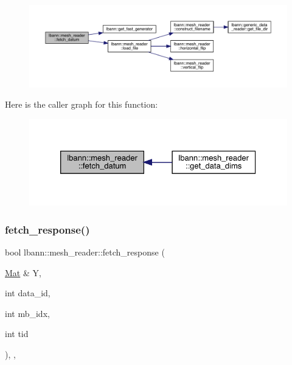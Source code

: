 \begin{figure}[H]
\begin{center}
\leavevmode
\includegraphics[width=350pt]{classlbann_1_1mesh__reader_a0ed2aa6d5ec6509c15d0cf7d9657df29_cgraph}
\end{center}
\end{figure}
Here is the caller graph for this function\+:\nopagebreak
\begin{figure}[H]
\begin{center}
\leavevmode
\includegraphics[width=326pt]{classlbann_1_1mesh__reader_a0ed2aa6d5ec6509c15d0cf7d9657df29_icgraph}
\end{center}
\end{figure}
\mbox{\label{classlbann_1_1mesh__reader_acc56c299c9ec75506d2780d2098cbe99}} 
\subsubsection{\texorpdfstring{fetch\+\_\+response()}{fetch\_response()}}
{\footnotesize\ttfamily bool lbann\+::mesh\+\_\+reader\+::fetch\+\_\+response (\begin{DoxyParamCaption}\item[{\hyperlink{base_8hpp_a68f11fdc31b62516cb310831bbe54d73}{Mat} \&}]{Y,  }\item[{int}]{data\+\_\+id,  }\item[{int}]{mb\+\_\+idx,  }\item[{int}]{tid }\end{DoxyParamCaption})\hspace{0.3cm}{\ttfamily [override]}, {\ttfamily [protected]}, {\ttfamily [virtual]}}

